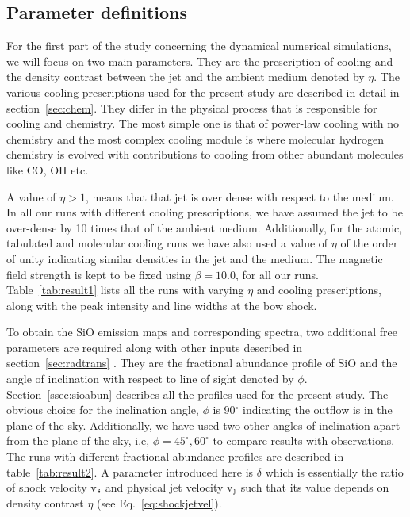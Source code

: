 \documentclass[useAMS,usenatbib]{mn2e}
\begin{document}
\subsection{Parameter definitions}
\label{ssec:paradef}
For the first part of the study concerning the dynamical numerical
simulations, we will focus on two main parameters. They are the
prescription of cooling and the density contrast between the jet and
the ambient medium denoted by $\eta$. The various cooling prescriptions used for the present study are
described in detail in section~\ref{sec:chem}. They differ in the
physical process that is responsible for cooling and chemistry. The
most simple one is that of power-law cooling with no chemistry and the
most complex cooling module is where molecular hydrogen chemistry is
evolved with contributions to cooling from other abundant molecules
like CO, OH etc. 
%

A value of $\eta > 1$, means that
that jet is over dense with respect to the medium. In all our runs with
different cooling prescriptions, we have assumed the jet to be
over-dense by 10 times that of the ambient medium. Additionally, for
the atomic, tabulated and molecular cooling runs we have also used a
value of $\eta$ of the order of unity indicating similar densities in
the jet and the medium. 
The magnetic field strength is kept to be fixed using $\beta = 10.0$,
for all our runs. Table~\ref{tab:result1} lists all the runs with
varying $\eta$ and cooling prescriptions, along with the peak
intensity and line widths at the bow shock.
%

To obtain the SiO emission maps and corresponding
spectra, two additional free parameters are required along with other
inputs described in section~\ref{sec:radtrans} . They are
the fractional abundance profile of SiO and the angle of inclination with
respect to line of sight denoted by $\phi$. Section~\ref{ssec:sioabun}
describes all the profiles used for the present study. The obvious
choice for the inclination angle, $\phi$ is 90$^{\circ}$ indicating
the outflow is in the plane of the sky. 
Additionally, we have used two other angles of inclination apart from the
plane of the sky, i.e, $\phi = 45^{\circ}, 60^{\circ}$ to compare
results with observations. The runs with different fractional
abundance profiles are described in table~\ref{tab:result2}. A
parameter introduced here is $\delta$ which is essentially the ratio
of shock velocity v$_{\rm s}$ and physical jet velocity v$_{\rm
  j}$ such that its value depends on density contrast $\eta$
(see Eq.~\ref{eq:shockjetvel}).
\end{document}
